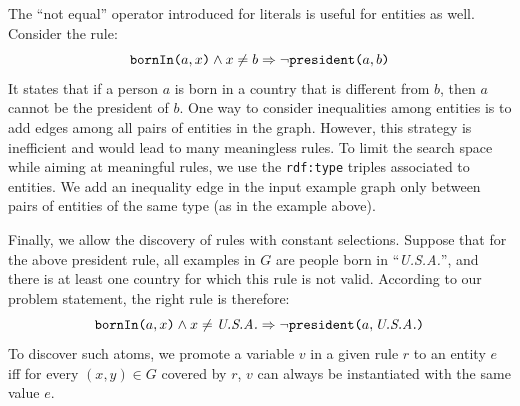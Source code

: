 \noindent {}
The ``not equal'' operator introduced for literals is useful for entities as well. 
Consider the rule:
$$ \texttt{bornIn(}a,x\texttt{)} \wedge x \neq b \Rightarrow \neg \texttt{president(}a,b\texttt{)} $$
It states that if a person $a$ is born in a country that is different from $b$, then $a$ cannot be the president of $b$.
One way to consider inequalities among entities is to add edges among all pairs of entities in the graph. However, this strategy is inefficient and would lead to many meaningless rules. To limit the search space while aiming at meaningful rules, we use the \texttt{rdf:type} triples associated to entities. We add an inequality edge in the input example graph only between pairs of entities of the same type (as in the example above). %

\noindent {}
Finally, we allow the discovery of rules with constant selections. %
Suppose that for the above president rule, all examples in $G$ are people born in ``\textit{U.S.A.}'', and there is at least one country for which this rule is not valid. 
According to our problem statement, the right rule is therefore:
%
$$ \texttt{bornIn(}a,x\texttt{)} \wedge x \neq \emph{U.S.A.} \Rightarrow \neg \texttt{president(}a,\emph{U.S.A.}\texttt{)} $$
%
To discover such atoms, %
we promote a variable $v$ in a given rule $r$ to an entity $e$ iff for every $(x,y) \in G$ covered by $r$, $v$ can always be instantiated with the same value $e$. 

\vspace{-1ex}
